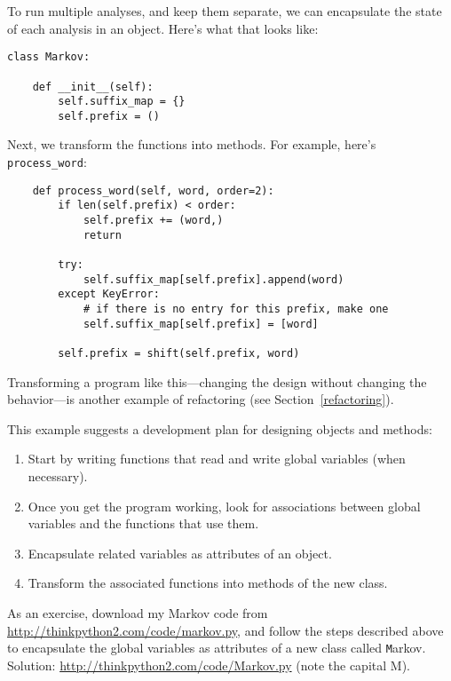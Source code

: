 \documentclass[
DIV=11,
fontsize=12,
twoside,
headinclude=false,
titlepage=firstiscover,
abstract=true,
headsepline=true,
footsepline=true,
chapterprefix=true, %
headings=big,
bibliography=totoc,%
captions=tableheading
]{scrbook}
\theoremstyle{definition}
\begin{document}
To run multiple analyses, and keep them separate, we can encapsulate
the state of each analysis in an object.
Here's what that looks like:

\begin{lstlisting}
class Markov:

    def __init__(self):
        self.suffix_map = {}
        self.prefix = ()    
\end{lstlisting}

Next, we transform the functions into methods.  For example,
here's \verb"process_word":

\begin{lstlisting}
    def process_word(self, word, order=2):
        if len(self.prefix) < order:
            self.prefix += (word,)
            return

        try:
            self.suffix_map[self.prefix].append(word)
        except KeyError:
            # if there is no entry for this prefix, make one
            self.suffix_map[self.prefix] = [word]

        self.prefix = shift(self.prefix, word)        
\end{lstlisting}

Transforming a program like this---changing the design without
changing the behavior---is another example of refactoring
(see Section~\ref{refactoring}).

This example suggests a development plan for designing objects and
methods:

\begin{enumerate}

\item Start by writing functions that read and write global
variables (when necessary).

\item Once you get the program working, look for associations
between global variables and the functions that use them.

\item Encapsulate related variables as attributes of an object.

\item Transform the associated functions into methods of the new
class.

\end{enumerate}

As an exercise, download my Markov code from
\url{http://thinkpython2.com/code/markov.py}, and follow the steps
described above to encapsulate the global variables as attributes of a
new class called {\texttt Markov}.  Solution:
\url{http://thinkpython2.com/code/Markov.py} (note the capital M).
\end{document}
